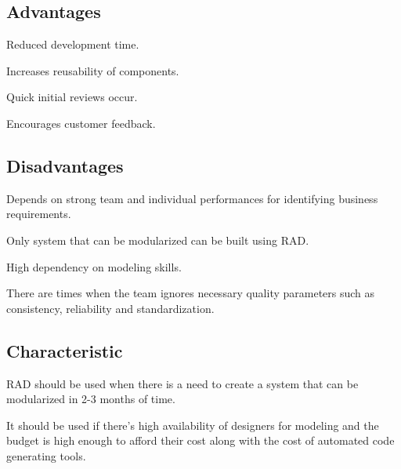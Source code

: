 \subsection*{Advantages}
Reduced development time.

Increases reusability of components.

Quick initial reviews occur.

Encourages customer feedback.

\subsection*{Disadvantages}
Depends on strong team and individual performances for identifying business requirements.

Only system that can be modularized can be built using RAD.

High dependency on modeling skills.

There are times when the team ignores necessary quality parameters such as consistency, reliability and standardization.

\subsection*{Characteristic}
RAD should be used when there is a need to create a system that can be modularized in 2-3 months of time.

It should be used if there’s high availability of designers for modeling and the budget is high enough to afford their cost along with the cost of automated code generating tools.
